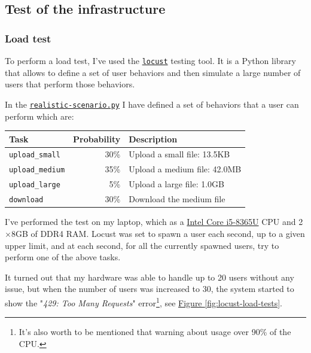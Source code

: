 \subsection{Test of the infrastructure}
\label{subsec:test}
\subsubsection{Load test}
\label{subsubsec:test}

To perform a load test, I've used the \href{https://locust.io/}{\texttt{locust}} testing tool. It is a Python library that allows to define a set of user behaviors and then simulate a large number of users that perform those behaviors.

In the \href{https://github.com/IsacPasianotto/cloud-computing-assignment/blob/main/exercise01/locust/realistic-scenario.py}{\texttt{realistic-scenario.py}} I have defined a set of behaviors that a user can perform which are: 


\begin{center}
    \begin{tabular}{lrl}
        \hline
        Task & Probability & Description \\
        \hline
        \texttt{upload\_small} & 30\% & Upload a small file: 13.5KB \\
        \texttt{upload\_medium} & 35\% & Upload a medium file: 42.0MB \\
        \texttt{upload\_large} & 5\% & Upload a large file: 1.0GB \\
        \texttt{download} & 30\% & Download the medium file \\
        \hline
    \end{tabular}
\end{center}

I've performed the test on my laptop, which as a \href{https://www.intel.com/content/www/us/en/products/sku/193555/intel-core-i58365u-processor-6m-cache-up-to-4-10-ghz/specifications.html}{Intel Core i5-8365U} CPU and 2$\times$8GB of DDR4 RAM.
Locust was set to spawn a user each second, up to a given upper limit, and at each second, for all the currently spawned users, try to perform one of the above tasks.

It turned out that my hardware was able to handle up to 20 users without any issue, but when the number of users was increased to 30, the system started to show the "\textit{429: Too Many Requests}" error\footnote{It's also worth to be mentioned that warning about usage over 90\% of the CPU.}, see \hyperref[fig:locust-load-tests]{Figure \ref{fig:locust-load-tests}}. 

